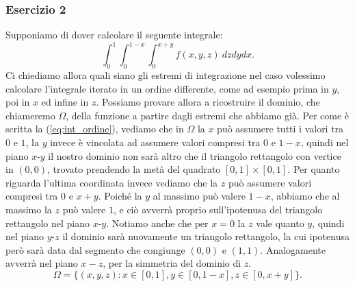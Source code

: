 \documentclass[10pt]{article}
\theoremstyle{plain}
\theoremstyle{definition}
\begin{document}
\subsubsection{Esercizio 2}
Supponiamo di dover calcolare il seguente integrale:
\begin{equation}
\int_0^1 \int_0^{1-x} \int_0^{x+y} f(x,y,z)\ dz dy dx.
\label{eq:int_ordine}
\end{equation}
Ci chiediamo allora quali siano gli estremi di integrazione nel caso volessimo calcolare l'integrale iterato in un ordine differente, come ad esempio prima in $y$, poi in $x$ ed infine in $z$. Possiamo provare allora a ricostruire il dominio, che chiameremo $\Omega$, della funzione a partire dagli estremi che abbiamo già.
Per come è scritta la (\ref{eq:int_ordine}), vediamo che in $\Omega$ la $x$ può assumere tutti i valori tra $0$ e $1$, la $y$ invece è vincolata ad assumere valori compresi tra $0$ e $1-x$, quindi nel piano $x$-$y$ il nostro dominio non sarà altro che il triangolo rettangolo con vertice in $(0,0)$, trovato prendendo la metà del quadrato $[0,1]\times[0,1]$. 
Per quanto riguarda l'ultima coordinata invece vediamo che la $z$ può assumere valori compresi tra $0$ e $x+y$. 
Poiché la $y$ al massimo può valere $1-x$, abbiamo che al massimo la $z$ può valere $1$, e ciò avverrà proprio sull'ipotenusa del triangolo rettangolo nel piano $x$-$y$.
Notiamo anche che per $x=0$ la $z$ vale quanto $y$, quindi nel piano $y$-$z$ il dominio sarà nuovamente un triangolo rettangolo, la cui ipotenusa però sarà data dal segmento che congiunge $(0,0)$ e $(1,1)$. 
Analogamente avverrà nel piano $x-z$, per la simmetria del dominio di $z$.
$$\Omega=\{ (x,y,z):x\in [0,1], y\in [0,1-x], z\in [0,x+y] \} .$$
\end{document}
